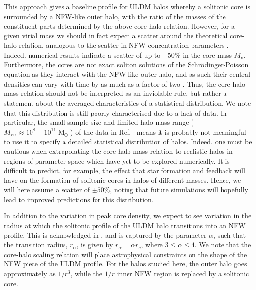 \documentclass[a4paper,11pt]{article}
\begin{document}
This approach gives a baseline profile for ULDM halos whereby a solitonic core is surrounded by a NFW-like outer halo, with the ratio of the masses of the constituent parts determined by the above core-halo relation. However, for a given virial mass we should in fact expect a scatter around the theoretical core-halo relation, analogous to the scatter in NFW concentration parameters \cite{Maccio:2008pcd}. Indeed, numerical results \cite{Schive:2014hza} indicate a scatter of up to $\pm 50\%$ in the core mass $M_c$. Furthermore, the cores are not exact soliton solutions of the Schr\"{o}dinger-Poisson equation as they interact with the NFW-like outer halo, and as such their central densities can vary with time by as much as a factor of two \cite{Veltmaat:2018dfz}. Thus, the core-halo mass relation should not be interpreted as an inviolable rule, but rather a statement about the averaged characteristics of a statistical distribution. We note that this distribution is still poorly characterised due to a lack of data. In particular, the small sample size and limited halo mass range ($ M_{\mathrm{vir}} \approx 10^8-10^{11} \operatorname{M}_{\odot}$)  of the data in Ref.~\cite{Schive:2014hza} means it is probably not meaningful to use it to specify a detailed statistical distribution of halos. Indeed, one must be cautious when extrapolating the core-halo mass relation to realistic halos in regions of parameter space which have yet to be explored numerically. It is difficult to predict, for example, the effect that star formation and feedback will have on the formation of solitonic cores in halos of different masses. Hence, we will here assume a scatter of $\pm 50\%$, noting that future simulations will hopefully lead to improved predictions for this distribution. 

In addition to the variation in peak core density, we expect to see variation in the radius at which the solitonic profile of the ULDM halo transitions into an NFW profile. This is acknowledged in \cite{Robles:2018fur}, and is captured by the parameter $\alpha$, such that the transition radius, $r_{\alpha}$, is given by $r_{\alpha} = \alpha r_c$, where $3 \leq \alpha \leq 4$. We note that the core-halo scaling relation will place astrophysical constraints on the shape of the NFW piece of the ULDM profile. For the halos studied here, the outer halo goes approximately as $1/r^3$, while the $1/r$ inner NFW region is replaced by a solitonic core.
\end{document}
